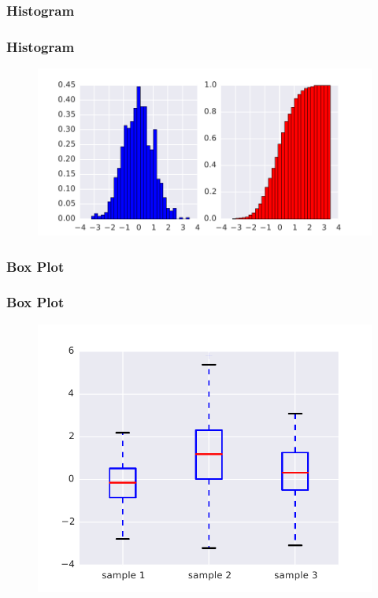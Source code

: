 \begin{frame}
\frametitle{Histogram}
\lstset{basicstyle=\small}
\end{frame}

\begin{frame}
\frametitle{Histogram}
\begin{figure}[h]
\centering
\includegraphics[width=.9\textwidth]{img/histogram.pdf}
\end{figure}
\end{frame}


\begin{frame}
\frametitle{Box Plot}
\end{frame}

\begin{frame}
\frametitle{Box Plot}
\begin{figure}[h]
\centering
\includegraphics[width=.9\textwidth]{img/boxplot.pdf}
\end{figure}
\end{frame}


